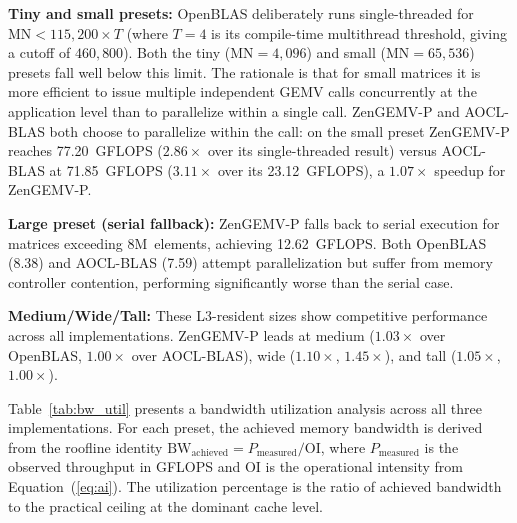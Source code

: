 \documentclass[conference]{IEEEtran}
\begin{document}
\textbf{Tiny and small presets:} OpenBLAS deliberately runs single-threaded for
$\text{MN} < 115{,}200 \times T$ (where $T=4$ is its compile-time multithread
threshold, giving a cutoff of $460{,}800$). Both the tiny ($\text{MN}=4{,}096$)
and small ($\text{MN}=65{,}536$) presets fall well below this limit. The
rationale is that for small matrices it is more efficient to issue multiple
independent GEMV calls concurrently at the application level than to parallelize
within a single call. ZenGEMV-P and AOCL-BLAS both choose to parallelize within the
call: on the small preset ZenGEMV-P reaches 77.20~GFLOPS ($2.86\times$ over its
single-threaded result) versus AOCL-BLAS at 71.85~GFLOPS ($3.11\times$ over its
23.12~GFLOPS), a $1.07\times$ speedup for ZenGEMV-P.

\textbf{Large preset (serial fallback):} ZenGEMV-P falls back to
serial execution for matrices exceeding $8\text{M}$~elements, achieving
12.62~GFLOPS. Both OpenBLAS (8.38) and AOCL-BLAS (7.59) attempt parallelization
but suffer from memory controller contention, performing significantly worse
than the serial case.

\textbf{Medium/Wide/Tall:} These L3-resident sizes show competitive performance
across all implementations. ZenGEMV-P leads at medium ($1.03\times$ over OpenBLAS,
$1.00\times$ over AOCL-BLAS), wide ($1.10\times$, $1.45\times$), and tall
($1.05\times$, $1.00\times$).


Table~\ref{tab:bw_util} presents a bandwidth utilization analysis across all
three implementations. For each preset, the achieved memory bandwidth is
derived from the roofline identity $\text{BW}_{\text{achieved}} =
P_{\text{measured}} / \text{OI}$, where $P_{\text{measured}}$ is the observed
throughput in GFLOPS and OI is the operational intensity from
Equation~(\ref{eq:ai}). The utilization percentage is the ratio of achieved
bandwidth to the practical ceiling at the dominant cache level.
\end{document}
